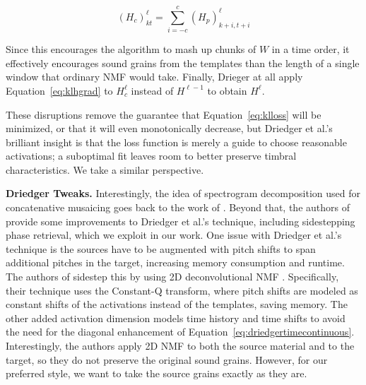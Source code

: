 \documentclass{article}
\begin{document}
\begin{equation}
    \label{eq:driedgertimecontinuous}
    (H_c)_{kt}^{\ell} = \sum_{i=-c}^c (H_p)^{\ell}_{k+i, t+i}
\end{equation}

Since this encourages the algorithm to mash up chunks of $W$ in a time order, it effectively encourages sound grains from the templates than the length of a single window that ordinary NMF would take.  Finally, Drieger at all apply Equation~\ref{eq:klhgrad} to $H_c^{\ell}$ instead of $H^{\ell-1}$ to obtain $H^{\ell}$.

These disruptions remove the guarantee that Equation~\ref{eq:klloss} will be minimized, or that it will even monotonically decrease, but Driedger et al.'s brilliant insight is that the loss function is merely a guide to choose reasonable activations; a suboptimal fit leaves room to better preserve timbral characteristics.  We take a similar perspective.

\textbf{Driedger Tweaks.} Interestingly, the idea of spectrogram decomposition used for concatenative musaicing goes back to the work of \cite{burred2013cross}.  Beyond that, the authors of \cite{buch2017nichtnegativematrixfaktorisierungnutzendesklangsynthesensystem} provide some improvements to Driedger et al.'s technique, including sidestepping phase retrieval, which we exploit in our work. One issue with Driedger et al.'s technique is the sources have to be augmented with pitch shifts to span additional pitches in the target, increasing memory consumption and runtime.  The authors of \cite{foroughmand2017multi, aarabi2018music} sidestep this by using 2D deconvolutional NMF \cite{schmidt2006nonnegative}.  Specifically, their technique uses the Constant-Q transform, where pitch shifts are modeled as constant shifts of the activations instead of the templates, saving memory.  The other added activation dimension models time history and time shifts to avoid the need for the diagonal enhancement of Equation~\ref{eq:driedgertimecontinuous}.  Interestingly, the authors apply 2D NMF to both the source material and to the target, so they do not preserve the original sound grains.  However, for our preferred style, we want to take the source grains exactly as they are.
\end{document}
